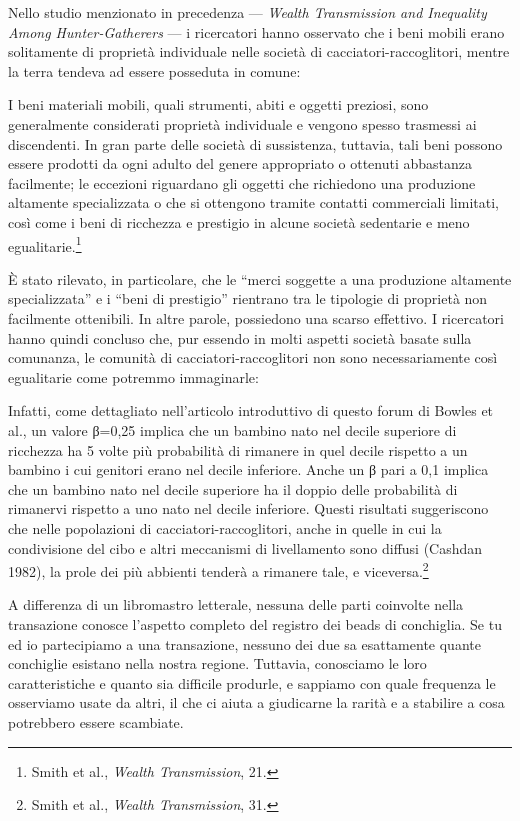 \documentclass[
  a5paper,
  smalldemyvopaper,10pt,twoside,onecolumn,openright,extrafontsizes,hidelinks]{memoir}
\renewenvironment{quote}%
               {\list{}{\rightmargin=.6cm\leftmargin=.6cm}%
                \itshape \item[]}%
               {\endlist}
\begin{document}
Nello studio menzionato in precedenza --- \emph{Wealth Transmission and
Inequality Among Hunter-Gatherers} --- i ricercatori hanno osservato che
i beni mobili erano solitamente di proprietà individuale nelle società
di cacciatori-raccoglitori, mentre la terra tendeva ad essere posseduta
in comune:

\begin{quote}
I beni materiali mobili, quali strumenti, abiti e oggetti preziosi, sono
generalmente considerati proprietà individuale e vengono spesso
trasmessi ai discendenti. In gran parte delle società di sussistenza,
tuttavia, tali beni possono essere prodotti da ogni adulto del genere
appropriato o ottenuti abbastanza facilmente; le eccezioni riguardano
gli oggetti che richiedono una produzione altamente specializzata o che
si ottengono tramite contatti commerciali limitati, così come i beni di
ricchezza e prestigio in alcune società sedentarie e meno
egualitarie.\footnote{Smith et al., \emph{Wealth Transmission}, 21.}
\end{quote}

È stato rilevato, in particolare, che le ``merci soggette a una
produzione altamente specializzata'' e i ``beni di prestigio'' rientrano
tra le tipologie di proprietà non facilmente ottenibili. In altre
parole, possiedono una scarso effettivo. I ricercatori hanno quindi
concluso che, pur essendo in molti aspetti società basate sulla
comunanza, le comunità di cacciatori-raccoglitori non sono
necessariamente così egualitarie come potremmo immaginarle:

\begin{quote}
Infatti, come dettagliato nell'articolo introduttivo di questo forum di
Bowles et al., un valore β=0,25 implica che un bambino nato nel decile
superiore di ricchezza ha 5 volte più probabilità di rimanere in quel
decile rispetto a un bambino i cui genitori erano nel decile inferiore.
Anche un β pari a 0,1 implica che un bambino nato nel decile superiore
ha il doppio delle probabilità di rimanervi rispetto a uno nato nel
decile inferiore. Questi risultati suggeriscono che nelle popolazioni di
cacciatori-raccoglitori, anche in quelle in cui la condivisione del cibo
e altri meccanismi di livellamento sono diffusi (Cashdan 1982), la prole
dei più abbienti tenderà a rimanere tale, e viceversa.\footnote{Smith et
  al., \emph{Wealth Transmission}, 31.}
\end{quote}

A differenza di un libromastro letterale, nessuna delle parti coinvolte
nella transazione conosce l'aspetto completo del registro dei beads di
conchiglia. Se tu ed io partecipiamo a una transazione, nessuno dei due
sa esattamente quante conchiglie esistano nella nostra regione.
Tuttavia, conosciamo le loro caratteristiche e quanto sia difficile
produrle, e sappiamo con quale frequenza le osserviamo usate da altri,
il che ci aiuta a giudicarne la rarità e a stabilire a cosa potrebbero
essere scambiate.
\end{document}
